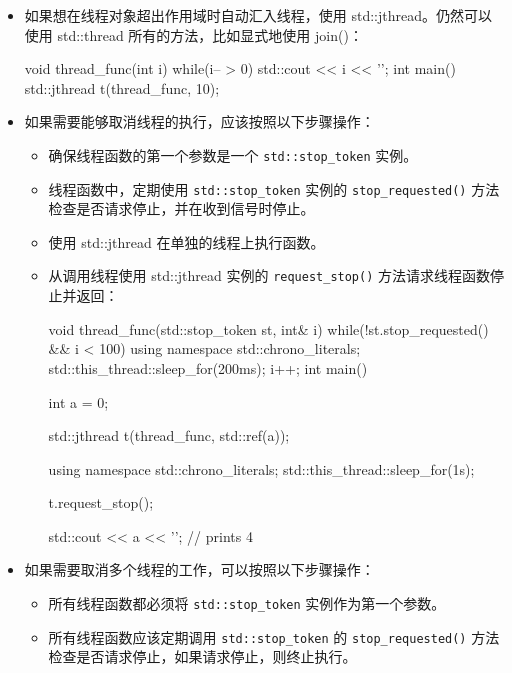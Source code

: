 \begin{itemize}
\item
如果想在线程对象超出作用域时自动汇入线程，使用 std::jthread。仍然可以使用 std::thread 所有的方法，比如显式地使用 join()：

\begin{cpp}
void thread_func(int i)
{
    while(i-- > 0)
    {
        std::cout << i << '\n';
    }
}
int main()
{
    std::jthread t(thread_func, 10);
}
\end{cpp}

\item
如果需要能够取消线程的执行，应该按照以下步骤操作：

\begin{itemize}
\item
确保线程函数的第一个参数是一个 \verb|std::stop_token| 实例。

\item
线程函数中，定期使用 \verb|std::stop_token| 实例的 \verb|stop_requested()| 方法检查是否请求停止，并在收到信号时停止。

\item
使用 std::jthread 在单独的线程上执行函数。

\item
从调用线程使用 std::jthread 实例的 \verb|request_stop()| 方法请求线程函数停止并返回：

\begin{cpp}
void thread_func(std::stop_token st, int& i)
{
    while(!st.stop_requested() && i < 100)
    {
        using namespace std::chrono_literals;
        std::this_thread::sleep_for(200ms);
        i++;
    }
}
int main()
{
    int a = 0;

    std::jthread t(thread_func, std::ref(a));

    using namespace std::chrono_literals;
    std::this_thread::sleep_for(1s);

    t.request_stop();

    std::cout << a << '\n';       // prints 4
}
\end{cpp}
\end{itemize}

\item
如果需要取消多个线程的工作，可以按照以下步骤操作：

\begin{itemize}
\item
所有线程函数都必须将 \verb|std::stop_token| 实例作为第一个参数。

\item
所有线程函数应该定期调用 \verb|std::stop_token| 的 \verb|stop_requested()| 方法检查是否请求停止，如果请求停止，则终止执行。


\end{itemize}
\end{itemize}
